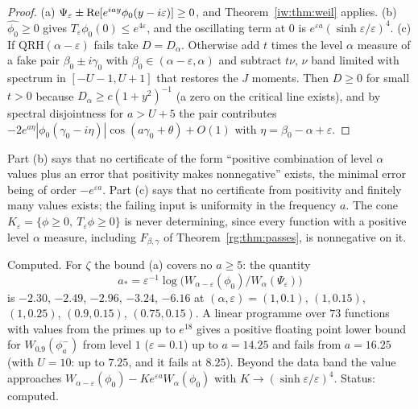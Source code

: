 \begin{proof}
(a) $\Psi_\varepsilon\pm\operatorname{Re}[e^{iay}\phi_0(y-i\varepsilon)]\ge0$, and Theorem~\ref{iw:thm:weil} applies. (b) $\widehat{\phi_0}\ge0$ gives $T_\varepsilon\phi_0(0)\le e^{4\varepsilon}$, and the oscillating term at $0$ is $e^{\varepsilon a}(\sinh\varepsilon/\varepsilon)^4$. (c) If $\mathrm{QRH}(\alpha-\varepsilon)$ fails take $D=D_\alpha$. Otherwise add $t$ times the level $\alpha$ measure of a fake pair $\beta_0\pm i\gamma_0$ with $\beta_0\in(\alpha-\varepsilon,\alpha)$ and subtract $t\nu$, $\nu$ band limited with spectrum in $[-U-1,U+1]$ that restores the $J$ moments. Then $D\ge0$ for small $t>0$ because $D_\alpha\ge c(1+y^2)^{-1}$ (a zero on the critical line exists), and by spectral disjointness for $a>U+5$ the pair contributes $-2e^{a\eta}|\phi_0(\gamma_0-i\eta)|\cos(a\gamma_0+\theta)+O(1)$ with $\eta=\beta_0-\alpha+\varepsilon$.
\end{proof}

Part (b) says that no certificate of the form ``positive combination of level $\alpha$ values plus an error that positivity makes nonnegative'' exists, the minimal error being of order $-e^{\varepsilon a}$. Part (c) says that no certificate from positivity and finitely many values exists; the failing input is uniformity in the frequency $a$. The cone $K_\varepsilon=\{\phi\ge0,\ T_\varepsilon\phi\ge0\}$ is never determining, since every function with a positive level $\alpha$ measure, including $F_{\beta,\gamma}$ of Theorem~\ref{rg:thm:passes}, is nonnegative on it.

Computed. For $\zeta$ the bound (a) covers no $a\ge5$: the quantity
\[a_*=\varepsilon^{-1}\log\big(W_{\alpha-\varepsilon}(\phi_0)/W_\alpha(\Psi_\varepsilon)\big)\]
is $-2.30$, $-2.49$, $-2.96$, $-3.24$, $-6.16$ at $(\alpha,\varepsilon)=(1,0.1)$, $(1,0.15)$, $(1,0.25)$, $(0.9,0.15)$, $(0.75,0.15)$. A linear programme over $73$ functions with values from the primes up to $e^{18}$ gives a positive floating point lower bound for $W_{0.9}(\phi_a^-)$ from level $1$ ($\varepsilon=0.1$) up to $a=14.25$ and fails from $a=16.25$ (with $U=10$: up to $7.25$, and it fails at $8.25$). Beyond the data band the value approaches $W_{\alpha-\varepsilon}(\phi_0)-Ke^{\varepsilon a}W_\alpha(\phi_0)$ with $K\to(\sinh\varepsilon/\varepsilon)^4$. Status: computed.

